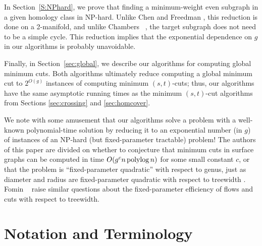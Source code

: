 \documentclass[letterpaper,review]{siamart190516}
\def\Z{\mathbb{Z}}
\def\snip{\mathbin{\raisebox{0.15ex}{\rotatebox[origin=c]{60}{\Rightscissors}\!}}}
\def\snip{\mathbin{\backslash\!\!\backslash}}
\begin{document}
In Section~\ref{S:NPhard}, we prove that finding a minimum-weight even subgraph in a given homology class in NP-hard.  
Unlike Chen and Freedman \cite{cf-hrhl-10}, this reduction is done on a 2-manifold, and unlike Chambers \etal~\cite{ccelw-scsih-08}, the target subgraph does not need to be a simple cycle.
This reduction implies that the exponential dependence on $g$ in our algorithms is probably unavoidable.  

Finally, in Section~\ref{sec:global}, we describe our algorithms for computing global minimum cuts.  Both algorithms ultimately reduce computing a global minimum cut to  $2^{O(g)}$ instances of computing minimum $(s,t)$-cuts; thus, our algorithms have the same asymptotic running times as the minimum $(s,t)$-cut algorithms from Sections \ref{sec:crossing} and \ref{sec:homcover}.

We note with some amusement that our algorithms solve a problem with a well-known polynomial-time solution by reducing it to an exponential number (in $g$) of instances of an NP-hard (but fixed-parameter tractable) problem!  
The authors of this paper are divided on whether to conjecture that minimum cuts in surface graphs can  be computed in time $O(g^c n\operatorname{polylog} n)$ for some small constant $c$, or that the problem is “fixed-parameter quadratic” with respect to genus, just as diameter and radius are fixed-parameter quadratic with respect to treewidth \cite{aww-afpsa-16}.  
Fomin \etal~\cite{flspw-fppcg-18} raise similar questions about the fixed-parameter efficiency of flows and cuts with respect to treewidth.


\section{Notation and Terminology}
\label{sec:prelims}

%
\end{document}
